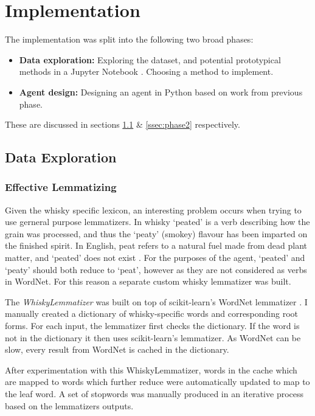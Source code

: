 \section{Implementation}\label{sec:imp}

The implementation was split into the following two broad phases:
\begin{itemize}
    \item \textbf{Data exploration:} Exploring the dataset, and potential prototypical methods in 
    a Jupyter Notebook \cite{Kluyver2016jupyter}. Choosing a method to implement.
    \item \textbf{Agent design:} Designing an agent in Python based on work from previous phase.
\end{itemize}
These are discussed in sections \ref{ssec:phase1} \& \ref{ssec:phase2} respectively.

\subsection{Data Exploration}\label{ssec:phase1}
\subsubsection{Effective Lemmatizing}\label{words}
Given the whisky specific lexicon, an interesting problem occurs when trying to use gerneral purpose lemmatizers.
In whisky `peated' is a verb describing how the grain was processed, and thus the `peaty' (smokey) flavour has been 
imparted on the finished spirit.  In English, peat refers to a natural fuel made from dead plant matter,
and `peated' does not exist \cite{jenner_2019}. 
For the purposes of the agent, `peated' and `peaty' should both reduce to `peat', however as they are not considered 
as verbs in WordNet.  For this reason a separate custom whisky lemmatizer was built.

The \emph{WhiskyLemmatizer} was built on top of scikit-learn's WordNet lemmatizer \cite{Barupal2011}. I manually created
a dictionary of whisky-specific words and corresponding root forms. For each input, the lemmatizer first checks the 
dictionary. If the word is not in the dictionary it then uses scikit-learn's lemmatizer. As WordNet can be slow,
every result from WordNet is cached in the dictionary.

After experimentation with this WhiskyLemmatizer, words in the cache which are mapped to words which further reduce
were automatically updated to map to the leaf word. A set of stopwords was manually produced in an 
iterative process based on the lemmatizers outputs.

